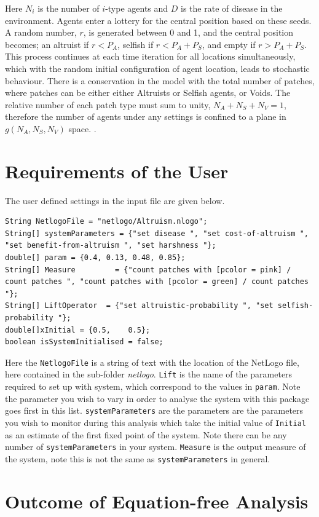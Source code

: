 \documentclass[11pt]{article}
\begin{document}
	Here $N_i$ is the number of $i$-type agents and $D$ is the rate of disease in the environment. Agents enter a lottery for the central position based on these seeds. A random number, $r$, is generated between 0 and 1, and the central position becomes; an altruist if $r<P_A$, selfish if $r<P_A+P_S$, and empty if $r>P_A+P_S$. This process continues at each time iteration for all locations simultaneously, which with the random initial configuration of agent location, leads to stochastic behaviour. There is a conservation in the model with the total number of patches, where patches can be either either Altruists or Selfish agents, or Voids. The relative number of each patch type must sum to unity, $N_A+N_S+N_V=1$, therefore the number of agents under any settings is confined to a plane in $g(N_A,N_S,N_V)$ space. . 

\newpage
\section{Requirements of the User}
The user defined settings in the input file are given below. 
\begin{lstlisting}
String NetlogoFile = "netlogo/Altruism.nlogo"; 
String[] systemParameters = {"set disease ", "set cost-of-altruism ", "set benefit-from-altruism ", "set harshness "};	
double[] param = {0.4, 0.13, 0.48, 0.85};		
String[] Measure		 = {"count patches with [pcolor = pink] / count patches ", "count patches with [pcolor = green] / count patches "};	
String[] LiftOperator  = {"set altruistic-probability ", "set selfish-probability "}; 
double[]xInitial = {0.5,	0.5};
boolean isSystemInitialised = false;
\end{lstlisting}		
	Here the {\tt NetlogoFile} is a string of text with the location of the NetLogo file, here contained in the sub-folder {\it netlogo}. {\tt Lift} is the name of the parameters required to set up with system, which correspond to the values in {\tt param}. Note the parameter you wish to vary in order to analyse the system with this package goes first in this list. {\tt systemParameters} are the parameters are the parameters you wish to monitor during this analysis which take the initial value of {\tt Initial} as an estimate of the first fixed point of the system. Note there can be any number of {\tt systemParameters} in your system. {\tt Measure} is the output measure of the system, note this is not the same as {\tt systemParameters} in general.

\section{Outcome of Equation-free Analysis}
\end{document}
